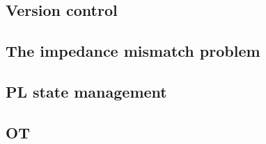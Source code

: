 \documentclass[english,submission]{programming}
\theoremstyle{definition}
\begin{document}

\subsection{Version control}\label{VC}




\subsection{The impedance mismatch problem} \label{impedance}


\subsection{PL state management}\label{PLstate}





\subsection{OT}\label{OT}
\end{document}
